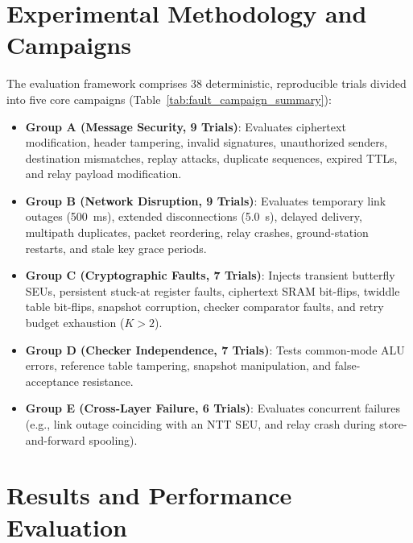 \documentclass[conference,10pt]{IEEEtran}
\begin{document}
\section{Experimental Methodology and Campaigns}
\label{sec:methodology}



The evaluation framework comprises 38 deterministic, reproducible trials divided into five core campaigns (Table~\ref{tab:fault_campaign_summary}):
\begin{itemize}
    \item \textbf{Group A (Message Security, 9 Trials)}: Evaluates ciphertext modification, header tampering, invalid signatures, unauthorized senders, destination mismatches, replay attacks, duplicate sequences, expired TTLs, and relay payload modification.
    \item \textbf{Group B (Network Disruption, 9 Trials)}: Evaluates temporary link outages (500~ms), extended disconnections (5.0~s), delayed delivery, multipath duplicates, packet reordering, relay crashes, ground-station restarts, and stale key grace periods.
    \item \textbf{Group C (Cryptographic Faults, 7 Trials)}: Injects transient butterfly SEUs, persistent stuck-at register faults, ciphertext SRAM bit-flips, twiddle table bit-flips, snapshot corruption, checker comparator faults, and retry budget exhaustion ($K > 2$).
    \item \textbf{Group D (Checker Independence, 7 Trials)}: Tests common-mode ALU errors, reference table tampering, snapshot manipulation, and false-acceptance resistance.
    \item \textbf{Group E (Cross-Layer Failure, 6 Trials)}: Evaluates concurrent failures (e.g., link outage coinciding with an NTT SEU, and relay crash during store-and-forward spooling).
\end{itemize}

\section{Results and Performance Evaluation}
\label{sec:results}


\end{document}
